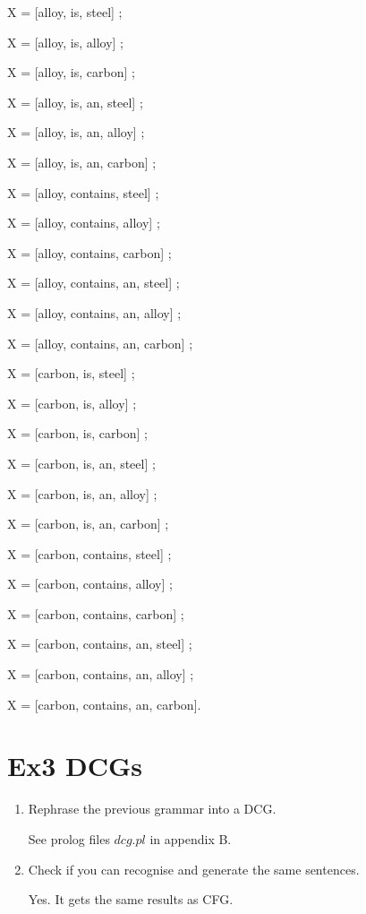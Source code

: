 \documentclass[12pt]{article}
\begin{document}
{\begin{enumerate}[1.]
    X = [alloy, is, steel] ;

    X = [alloy, is, alloy] ;

    X = [alloy, is, carbon] ;

    X = [alloy, is, an, steel] ;

    X = [alloy, is, an, alloy] ;

    X = [alloy, is, an, carbon] ;

    X = [alloy, contains, steel] ;

    X = [alloy, contains, alloy] ;

    X = [alloy, contains, carbon] ;

    X = [alloy, contains, an, steel] ;

    X = [alloy, contains, an, alloy] ;

    X = [alloy, contains, an, carbon] ;

    X = [carbon, is, steel] ;

    X = [carbon, is, alloy] ;

    X = [carbon, is, carbon] ;
    
    X = [carbon, is, an, steel] ;
    
    X = [carbon, is, an, alloy] ;
    
    X = [carbon, is, an, carbon] ;
    
    X = [carbon, contains, steel] ;
    
    X = [carbon, contains, alloy] ;
    
    X = [carbon, contains, carbon] ;
    
    X = [carbon, contains, an, steel] ;
    
    X = [carbon, contains, an, alloy] ;
    
    X = [carbon, contains, an, carbon].
\end{enumerate}

\section{Ex3 DCGs}
\label{sec: ex3}
\begin{enumerate}[1.]
    \item Rephrase the previous grammar into a DCG.
    
    See prolog files $dcg.pl$ in appendix B.
    \item Check if you can recognise and generate the same sentences.
    
    Yes. It gets the same results as CFG.
\end{enumerate}

}
\end{document}
